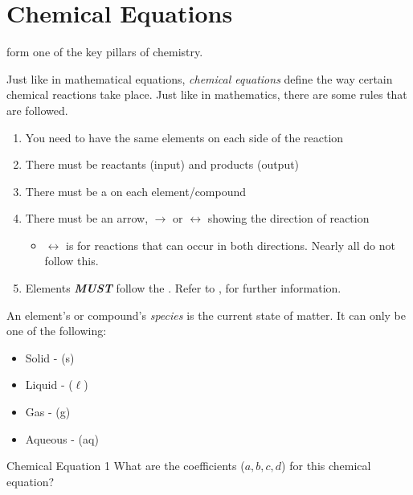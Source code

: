 \section{Chemical Equations} \label{sec:Chemical Equations}
 form one of the key pillars of chemistry.
\begin{definition} \label{def:Chemical Equations}
  Just like in mathematical equations, \emph{chemical equations} define the way certain chemical reactions take place.
  Just like in mathematics, there are some rules that are followed.
  \begin{enumerate}
    \item You need to have the same elements on each side of the reaction
    \item There must be reactants (input) and products (output)
    \item There must be a \emph{} on each element/compound
    \item There must be an arrow, $\rightarrow$ or $\leftrightarrow$ showing the direction of reaction
    \begin{itemize}[noitemsep, nolistsep]
      \item $\leftrightarrow$ is for reactions that can occur in both directions. Nearly all do not follow this.
    \end{itemize}
    \item Elements \textbf{\emph{MUST}} follow the . Refer to ,  for further information.
  \end{enumerate}
\end{definition}

\begin{definition}[Species] \label{def:Species}
  An element's or compound's \emph{species} is the current state of matter.
  It can only be one of the following:
  \begin{itemize}[noitemsep, nolistsep]
    \item Solid - (s)
    \item Liquid - ($\ell$)
    \item Gas - (g)
    \item Aqueous - (aq)
  \end{itemize}
\end{definition}

\begin{example}[]{Chemical Equation 1}
  What are the coefficients ($a, b, c, d$) for this chemical equation? \\
  
  \tcblower
  
\end{example}

